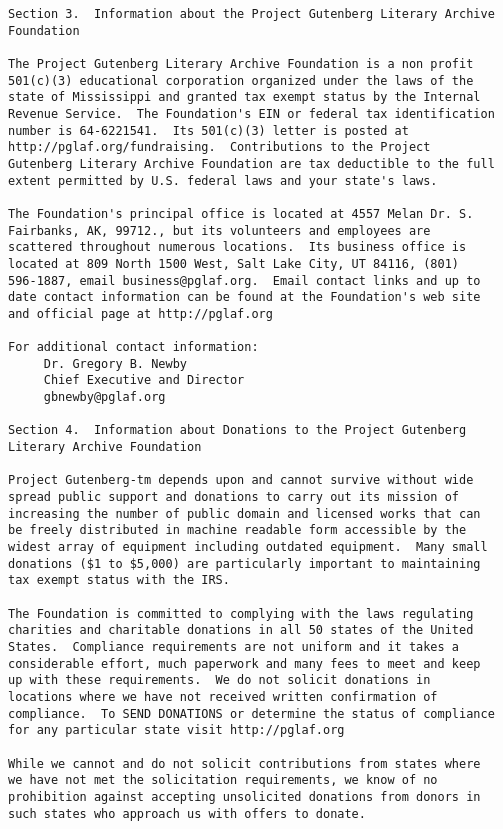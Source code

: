 \documentclass[letterpaper,12pt,oneside,openany]{memoir}
\begin{document}
\begin{verbatim}
Section 3.  Information about the Project Gutenberg Literary Archive
Foundation

The Project Gutenberg Literary Archive Foundation is a non profit
501(c)(3) educational corporation organized under the laws of the
state of Mississippi and granted tax exempt status by the Internal
Revenue Service.  The Foundation's EIN or federal tax identification
number is 64-6221541.  Its 501(c)(3) letter is posted at
http://pglaf.org/fundraising.  Contributions to the Project
Gutenberg Literary Archive Foundation are tax deductible to the full
extent permitted by U.S. federal laws and your state's laws.

The Foundation's principal office is located at 4557 Melan Dr. S.
Fairbanks, AK, 99712., but its volunteers and employees are
scattered throughout numerous locations.  Its business office is
located at 809 North 1500 West, Salt Lake City, UT 84116, (801)
596-1887, email business@pglaf.org.  Email contact links and up to
date contact information can be found at the Foundation's web site
and official page at http://pglaf.org

For additional contact information:
     Dr. Gregory B. Newby
     Chief Executive and Director
     gbnewby@pglaf.org

Section 4.  Information about Donations to the Project Gutenberg
Literary Archive Foundation

Project Gutenberg-tm depends upon and cannot survive without wide
spread public support and donations to carry out its mission of
increasing the number of public domain and licensed works that can
be freely distributed in machine readable form accessible by the
widest array of equipment including outdated equipment.  Many small
donations ($1 to $5,000) are particularly important to maintaining
tax exempt status with the IRS.

The Foundation is committed to complying with the laws regulating
charities and charitable donations in all 50 states of the United
States.  Compliance requirements are not uniform and it takes a
considerable effort, much paperwork and many fees to meet and keep
up with these requirements.  We do not solicit donations in
locations where we have not received written confirmation of
compliance.  To SEND DONATIONS or determine the status of compliance
for any particular state visit http://pglaf.org

While we cannot and do not solicit contributions from states where
we have not met the solicitation requirements, we know of no
prohibition against accepting unsolicited donations from donors in
such states who approach us with offers to donate.


\end{verbatim}
\end{document}
